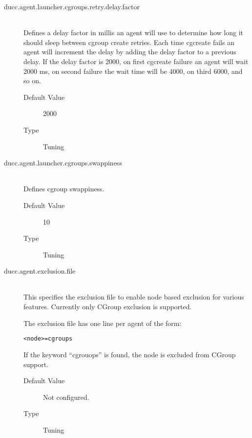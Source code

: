 \begin{description}
 
         \item[ducc.agent.launcher.cgroups.retry.delay.factor] \hfill \\
            \label{ducc.agent.launcher.cgroups.retry.delay.factor}
            Defines a delay factor in millis an agent will use to determine how long it
            should sleep between cgroup create retries. Each time cgcreate fails
            an agent will increment the delay by adding the delay factor to a previous 
            delay. If the delay factor is 2000, on first cgcreate failure an agent will
            wait 2000 ms, on second failure the wait time will be 4000, on third 6000, and
            so on.

            \begin{description}
              \item[Default Value] 2000
              \item[Type] Tuning 
            \end{description}

          \item[ducc.agent.launcher.cgroups.swappiness] \hfill \\
            \label{ducc.agent.launcher.cgroups.swappiness}
            Defines cgroup swappiness. 

            \begin{description}
              \item[Default Value] 10
              \item[Type] Tuning 
            \end{description}
            
	      \label{itm:props-agent.cgroups.exclusion}
          \item[ducc.agent.exclusion.file] \hfill \\
            This specifies the exclusion file to enable node based exclusion for various
            features.  Currently only CGroup exclusion is supported.

            The exclusion file has one line per agent of the form:
\begin{verbatim}
<node>=cgroups
\end{verbatim}
            If the keyword ``cgrouops'' is found, the node is excluded from CGroup
            support. 
          
            \begin{description}
              \item[Default Value] Not configured.
              \item[Type] Tuning 
            \end{description}
            

          \end{description}
      

